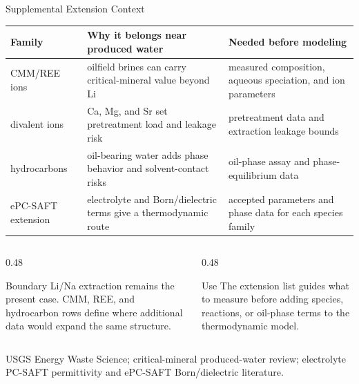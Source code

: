 \documentclass[aspectratio=169]{beamer}
\newcommand{\sourcefoot}[1]{\vfill{\scriptsize\color{netlgray}#1}}
\begin{document}
\begin{frame}{Supplemental Extension Context}
  \scriptsize
  {\setlength{\tabcolsep}{3pt}\renewcommand{\arraystretch}{1.24}
  \begin{tabular}{@{}>{\raggedright\arraybackslash}p{}>{\raggedright\arraybackslash}p{}>{\raggedright\arraybackslash}p{}@{}}
    \toprule
    Family & Why it belongs near produced water & Needed before modeling \\
    \midrule
    CMM/REE ions & oilfield brines can carry critical-mineral value beyond Li
      & measured composition, aqueous speciation, and ion parameters \\
    divalent ions & Ca, Mg, and Sr set pretreatment load and leakage risk &
      pretreatment data and extraction leakage bounds \\
    hydrocarbons & oil-bearing water adds phase behavior and solvent-contact
      risks & oil-phase assay and phase-equilibrium data \\
    ePC-SAFT extension & electrolyte and Born/dielectric terms give a
      thermodynamic route & accepted parameters and phase data for each species
      family \\
    \bottomrule
  \end{tabular}}
  \vspace{0.26cm}
  \begin{columns}[T,onlytextwidth]
    \begin{column}{0.48\textwidth}
      \begin{block}{Boundary}
        Li/Na extraction remains the present case. CMM, REE, and hydrocarbon
        rows define where additional data would expand the same structure.
      \end{block}
    \end{column}
    \begin{column}{0.48\textwidth}
      \begin{exampleblock}{Use}
        The extension list guides what to measure before adding species,
        reactions, or oil-phase terms to the thermodynamic model.
      \end{exampleblock}
    \end{column}
  \end{columns}
  \sourcefoot{USGS Energy Waste Science; critical-mineral produced-water review; electrolyte PC-SAFT permittivity and ePC-SAFT Born/dielectric literature.}
\end{frame}
\end{document}
